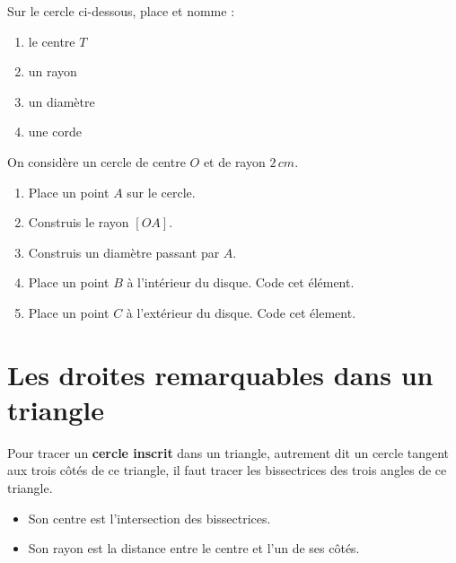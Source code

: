 \documentclass[../../syllabus_1.tex]{subfiles}
\begin{document}
\begin{exercise}
    Sur le cercle ci-dessous, place et nomme :

    \begin{enumerate}[cols=4, itemsep=0.8cm]
        \item le centre $T$
        \item un rayon
        \item un diamètre
        \item une corde
    \end{enumerate}

    \begin{center}
    \end{center}
\end{exercise}

\begin{exercise}
    On considère un cercle de centre $O$ et de rayon $2\,cm$.
    \begin{enumerate}
        \item Place un point $A$ sur le cercle.
        \item Construis le rayon $[OA]$.
        \item Construis un diamètre passant par $A$.
        \item Place un point $B$ à l'intérieur du disque. Code cet élément.
        \item Place un point $C$ à l'extérieur du disque. Code cet élement.
        \end{enumerate}
\end{exercise}

\newpage
\section{Les droites remarquables dans un triangle}

Pour tracer un \textbf{cercle inscrit} dans un triangle, autrement dit un cercle tangent aux trois côtés de ce triangle, il faut tracer les bissectrices des trois angles de ce triangle.
\begin{itemize}[label=\(\triangle\)]
  \item Son centre est l'intersection des bissectrices.
  \item Son rayon est la distance entre le centre et l'un de ses côtés.
\end{itemize}
\end{document}
